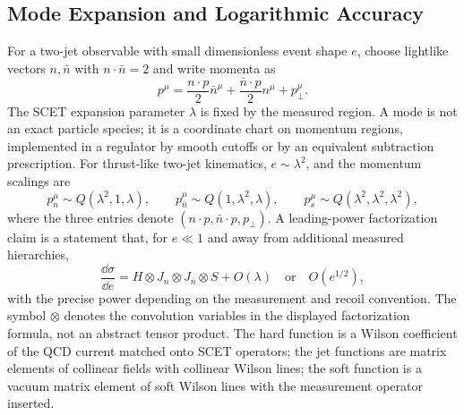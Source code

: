 \subsection{Mode Expansion and Logarithmic Accuracy}

For a two-jet observable with small dimensionless event shape \(e\), choose
lightlike vectors \(n,\bar n\) with \(n\cdot\bar n=2\) and write momenta as
\[
  p^\mu=\frac{n\cdot p}{2}\bar n^\mu
       +\frac{\bar n\cdot p}{2}n^\mu+p_\perp^\mu .
\]
The SCET expansion parameter \(\lambda\) is fixed by the measured region.  A
mode is not an exact particle species; it is a coordinate chart on momentum
regions, implemented in a regulator by smooth cutoffs or by an equivalent
subtraction prescription.  For thrust-like two-jet kinematics,
\(e\sim\lambda^2\), and the momentum scalings are
\[
  p_n^\mu\sim Q(\lambda^2,1,\lambda),\qquad
  p_{\bar n}^\mu\sim Q(1,\lambda^2,\lambda),\qquad
  p_s^\mu\sim Q(\lambda^2,\lambda^2,\lambda^2),
\]
where the three entries denote
\((n\cdot p,\bar n\cdot p,p_\perp)\).  A leading-power factorization claim
is a statement that, for \(e\ll1\) and away from additional measured
hierarchies,
\[
  \frac{\dd\sigma}{\dd e}
  =
  H\otimes J_n\otimes J_{\bar n}\otimes S
  +
  O(\lambda)
  \quad\text{or}\quad
  O(e^{1/2}),
\]
with the precise power depending on the measurement and recoil convention.
The symbol \(\otimes\) denotes the convolution variables in the displayed
factorization formula, not an abstract tensor product.  The hard function is a
Wilson coefficient of the QCD current matched onto SCET operators; the jet
functions are matrix elements of collinear fields with collinear Wilson
lines; the soft function is a vacuum matrix element of soft Wilson lines with
the measurement operator inserted.

